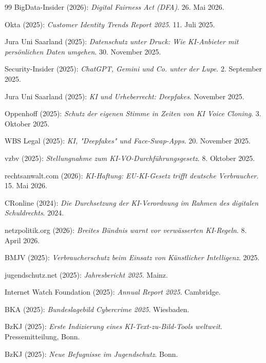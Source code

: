 \documentclass[12pt,a4paper]{article}
\begin{document}
\begin{thebibliography}{99}
		 BigData-Insider (2026): \emph{Digital Fairness Act (DFA)}. 26. Mai 2026.
		
		 Okta (2025): \emph{Customer Identity Trends Report 2025}. 11. Juli 2025.
		
		 Jura Uni Saarland (2025): \emph{Datenschutz unter Druck: Wie KI-Anbieter mit persönlichen Daten umgehen}. 30. November 2025.
		
		 Security-Insider (2025): \emph{ChatGPT, Gemini und Co. unter der Lupe}. 2. September 2025.
		
		 Jura Uni Saarland (2025): \emph{KI und Urheberrecht: Deepfakes}. November 2025.
		
		 Oppenhoff (2025): \emph{Schutz der eigenen Stimme in Zeiten von KI Voice Cloning}. 3. Oktober 2025.
		
		 WBS Legal (2025): \emph{KI, "Deepfakes" und Face-Swap-Apps}. 20. November 2025.
		
		 vzbv (2025): \emph{Stellungnahme zum KI-VO-Durchführungsgesetz}. 8. Oktober 2025.
		
		 rechtsanwalt.com (2026): \emph{KI-Haftung: EU-KI-Gesetz trifft deutsche Verbraucher}. 15. Mai 2026.
		
		 CRonline (2024): \emph{Die Durchsetzung der KI-Verordnung im Rahmen des digitalen Schuldrechts}. 2024.
		
		 netzpolitik.org (2026): \emph{Breites Bündnis warnt vor verwässerten KI-Regeln}. 8. April 2026.
		
		 BMJV (2025): \emph{Verbraucherschutz beim Einsatz von Künstlicher Intelligenz}. 2025.
		
		 jugendschutz.net (2025): \emph{Jahresbericht 2025}. Mainz.
		
		 Internet Watch Foundation (2025): \emph{Annual Report 2025}. Cambridge.
		
		 BKA (2025): \emph{Bundeslagebild Cybercrime 2025}. Wiesbaden.
		
		 BzKJ (2025): \emph{Erste Indizierung eines KI-Text-zu-Bild-Tools weltweit}. Pressemitteilung, Bonn.
		
		 BzKJ (2025): \emph{Neue Befugnisse im Jugendschutz}. Bonn.
		

\end{thebibliography}
\end{document}
